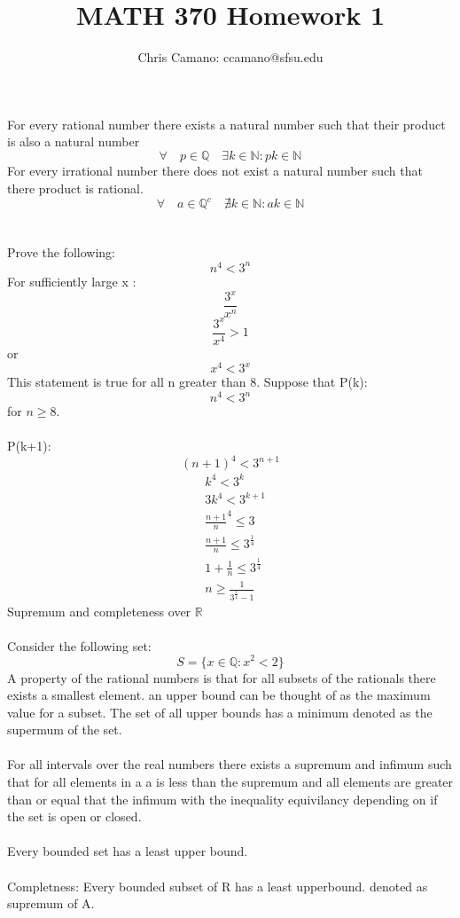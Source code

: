 \documentclass[12pt]{article}
\author{Chris Camano: ccamano@sfsu.edu}
\title{MATH 370  Homework 1 }
\date
\newcommand{\Q}{\mathbb{Q}}
\newcommand{\N}{\mathbb{N}}
\theoremstyle{definition}
\theoremstyle{remark}
\numberwithin{equation}{section}
\begin{document}
\maketitle
For every rational number there exists a natural number such that their product is also a natural number
\[
  \forall\quad  p\in \Q \quad \exists  k \in \N : pk\in \N
\]
For every irrational number there does not exist a natural number such that there product is rational.
\[
  \forall\quad  a \in \mathbb{Q}^c \quad \nexists k\in \N: ak\in \N
\]\\\\
Prove the following:
\[
  n^4< 3^n
\]
For sufficiently large x :
\[
  \frac{3^x}{x^n}
\]
\[
  \frac{3^x}{x^4}>1
\]
or
\[
  x^4<3^x
\]
This statement is true for all n greater than 8.
Suppose that
P(k):
\[
  n^4<3^n
\]
for $n\geq 8$.\\\\
P(k+1):
\[
  (n+1)^4<3^{n+1}
\]
\begin{align*}
  &k^4<3^k\\
  &3k^4<3^{k+1}\\
  &\frac{n+1}{n}^4\leq 3\\
  &\frac{n+1}{n}\leq 3^{\frac{1}{4}}\\
  &1+\frac{1}{n}\leq 3^{\frac{1}{4}}\\
  &n\geq \frac{1}{3^{\frac{1}{4}}-1}
\end{align*}
 Supremum and completeness over $\mathbb{R}$\\\\
Consider the following set:
\[
S=\{x\in \Q: x^2<2\}
\]
A property of the rational numbers is that for all subsets of the rationals there exists a smallest element. an upper bound can be thought of as the maximum value for a subset. The set of all upper bounds has a minimum denoted as the supermum of the set. \\\\
For all intervals over the real numbers there exists a supremum and infimum such that for all elements in a a is less than the supremum and all elements are greater than or equal that the infimum with the inequality equivilancy depending on if the set is open or closed. \\\\
Every bounded set has a least upper bound. \\\\
 Completness: Every bounded subset of R has a least upperbound. denoted as supremum of A. \\\\
\end{document}
